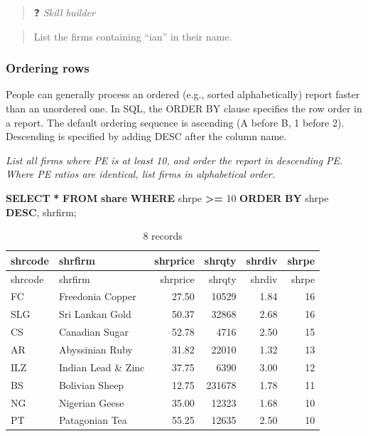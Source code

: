 \documentclass[
]{article}
\newenvironment{Shaded}{\begin{snugshade}}{\end{snugshade}}
\newcommand{\DecValTok}[1]{\textcolor[rgb]{0.00,0.00,0.81}{#1}}
\newcommand{\KeywordTok}[1]{\textcolor[rgb]{0.13,0.29,0.53}{\textbf{#1}}}
\newcommand{\NormalTok}[1]{#1}
\newcommand{\OperatorTok}[1]{\textcolor[rgb]{0.81,0.36,0.00}{\textbf{#1}}}
\begin{document}
\begin{quote}
❓ \emph{Skill builder}
\end{quote}

\begin{quote}
List the firms containing ``ian'' in their name.
\end{quote}

\hypertarget{ordering-rows}{%
\subsubsection{Ordering rows}\label{ordering-rows}}

People can generally process an ordered (e.g., sorted alphabetically)
report faster than an unordered one. In SQL, the ORDER BY clause
specifies the row order in a report. The default ordering sequence is
ascending (A before B, 1 before 2). Descending is specified by adding
DESC after the column name.

\emph{List all firms where PE is at least 10, and order the report in
descending PE. Where PE ratios are identical, list firms in alphabetical
order.}

\begin{Shaded}
\begin{Highlighting}[]
\KeywordTok{SELECT} \OperatorTok{*} \KeywordTok{FROM} \KeywordTok{share} \KeywordTok{WHERE}\NormalTok{ shrpe }\OperatorTok{\textgreater{}=} \DecValTok{10}
  \KeywordTok{ORDER} \KeywordTok{BY}\NormalTok{ shrpe }\KeywordTok{DESC}\NormalTok{, shrfirm;}
\end{Highlighting}
\end{Shaded}

\begin{longtable}[]{@{}llrrrr@{}}
\caption{8 records}\tabularnewline
\toprule()
shrcode & shrfirm & shrprice & shrqty & shrdiv & shrpe \\
\midrule()
\endfirsthead
\toprule()
shrcode & shrfirm & shrprice & shrqty & shrdiv & shrpe \\
\midrule()
\endhead
FC & Freedonia Copper & 27.50 & 10529 & 1.84 & 16 \\
SLG & Sri Lankan Gold & 50.37 & 32868 & 2.68 & 16 \\
CS & Canadian Sugar & 52.78 & 4716 & 2.50 & 15 \\
AR & Abyssinian Ruby & 31.82 & 22010 & 1.32 & 13 \\
ILZ & Indian Lead \& Zinc & 37.75 & 6390 & 3.00 & 12 \\
BS & Bolivian Sheep & 12.75 & 231678 & 1.78 & 11 \\
NG & Nigerian Geese & 35.00 & 12323 & 1.68 & 10 \\
PT & Patagonian Tea & 55.25 & 12635 & 2.50 & 10 \\
\bottomrule()
\end{longtable}
\end{document}

